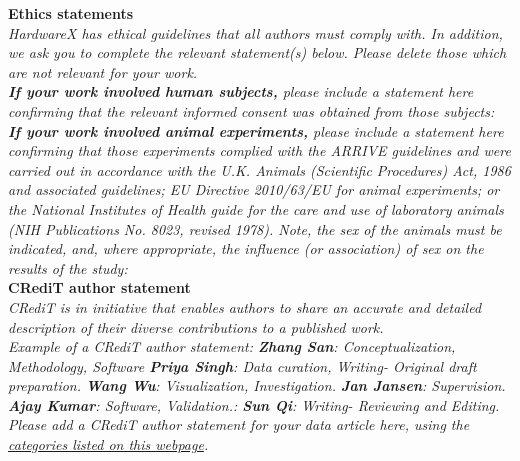 \documentclass[11pt, letterpaper]{article}
\begin{document}
\noindent
\textbf{Ethics statements}\\

\noindent
{\it HardwareX has ethical guidelines that all authors must comply with. In addition, we ask you to complete the relevant statement(s) below.  Please delete those which are not relevant for your work.}\\

\noindent
{\it \textbf{If your work involved human subjects,} please include a statement here confirming that the relevant informed consent was obtained from those subjects:}\\

\noindent
{\it \textbf{If your work involved animal experiments,} please include a statement here confirming that those experiments complied with the ARRIVE guidelines and were carried out in accordance with the U.K. Animals (Scientific Procedures) Act, 1986 and associated guidelines; EU Directive 2010/63/EU for animal experiments; or the National Institutes of Health guide for the care and use of laboratory animals (NIH Publications No. 8023, revised 1978). Note, the sex of the animals must be indicated, and, where appropriate, the influence (or association) of sex on the results of the study:}\\

\noindent
\textbf{CRediT author statement}\\
\noindent
{\it CRediT is in initiative that enables authors to share an accurate and detailed description of their diverse contributions to a published work.}\\

\noindent
{\it Example of a CRediT author statement: 
\textbf{Zhang San}: Conceptualization, Methodology, Software \textbf{Priya Singh}: Data curation, Writing- Original draft preparation. \textbf{Wang Wu}: Visualization, Investigation. \textbf{Jan Jansen}: Supervision. \textbf{Ajay Kumar}: Software, Validation.: \textbf{Sun Qi}: Writing- Reviewing and Editing.}\\

\noindent
{\it Please add a CRediT author statement for your data article here, using the \href{https://www.elsevier.com/authors/journal-authors/policies-and-ethics/credit-author-statement}{categories listed on this webpage}.}\\
\end{document}

